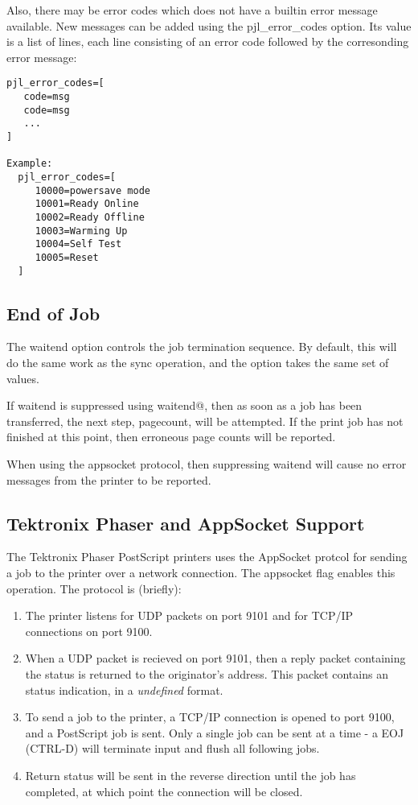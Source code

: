 \documentclass[a4paper]{article}
\begin{document}
Also, there may be error codes which does not have a builtin error
message available.  New messages can be added using the
{\ttfamily pjl\_error\_codes}
option.
Its value is a list of lines, each line consisting of an error code
followed by the corresonding error message:
\begin{tscreen}
\begin{verbatim}
pjl_error_codes=[
   code=msg
   code=msg
   ...
]

Example:
  pjl_error_codes=[
     10000=powersave mode
     10001=Ready Online
     10002=Ready Offline
     10003=Warming Up
     10004=Self Test
     10005=Reset
  ]
\end{verbatim}
\end{tscreen}



\subsection{End of Job
\label{waitend}}

The {\ttfamily waitend} option controls the job termination sequence.
By default,
this will do the same work as the
{\ttfamily sync} operation,
and the option takes the same set of values.

If {\ttfamily waitend}
is suppressed using {\ttfamily waitend@},
then as soon as a job has been transferred,
the next step,
{\ttfamily pagecount},
will be attempted.
If the print job has not finished at this point,
then erroneous page counts will be reported.

When using the {\ttfamily appsocket} protocol,
then suppressing {\ttfamily waitend} will cause no error messages from the printer to
be reported.




\subsection{Tektronix Phaser and AppSocket Support
\label{appsocket}}

The Tektronix Phaser PostScript printers uses the AppSocket protcol
for sending a job to the printer over a network connection.
The
{\ttfamily appsocket} flag enables this operation.
The protocol is (briefly):
\begin{enumerate}
\item  The printer listens for UDP packets on port 9101
and for TCP/IP connections on port 9100.
\item  When a UDP packet is recieved on port 9101, then a reply
packet containing the status is returned to the originator's
address.
This packet contains an status indication,
in a {\itshape undefined\/} format.
\item  To send a job to the printer,  a TCP/IP connection is opened to port
9100,
and a PostScript job is sent.
Only a single job can be sent at a time - a EOJ (CTRL-D)
will terminate input and flush all following jobs.
\item Return status will be sent in the reverse direction until the job
has completed,
at which point the connection will be closed.
\end{enumerate}
\end{document}
